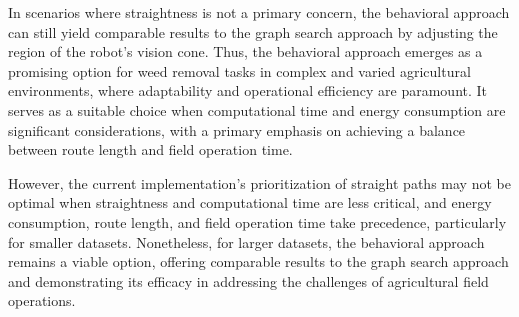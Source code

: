 \vspace*{6mm} 

In scenarios where straightness is not a primary concern, the behavioral approach can still yield comparable results to the graph search approach by adjusting the region of the robot's vision cone. Thus, the behavioral approach emerges as a promising option for weed removal tasks in complex and varied agricultural environments, where adaptability and operational efficiency are paramount. It serves as a suitable choice when computational time and energy consumption are significant considerations, with a primary emphasis on achieving a balance between route length and field operation time.

\vspace*{6mm} 

However, the current implementation's prioritization of straight paths may not be optimal when straightness and computational time are less critical, and energy consumption, route length, and field operation time take precedence, particularly for smaller datasets. Nonetheless, for larger datasets, the behavioral approach remains a viable option, offering comparable results to the graph search approach and demonstrating its efficacy in addressing the challenges of agricultural field operations.